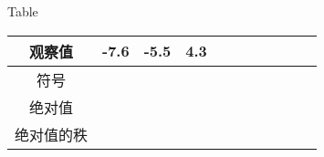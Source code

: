 \documentclass{article}
\begin{document}
	
Table

\begin{tabular}{|c|c|c|c|c|c|c|c|c|c|c|}
	\hline
	观察值 & -7.6 & -5.5 & 4.3 &  &  &  &  &  &  &  \\
	\hline
	符号 &  &  &  &  &  &  &  &  &  &  \\
	\hline
	绝对值 &  &  &  &  &  &  &  &  &  &  \\
	\hline
	绝对值的秩 &  &  &  &  &  &  &  &  &  &  \\
	\hline
\end{tabular}
	
\end{document}
